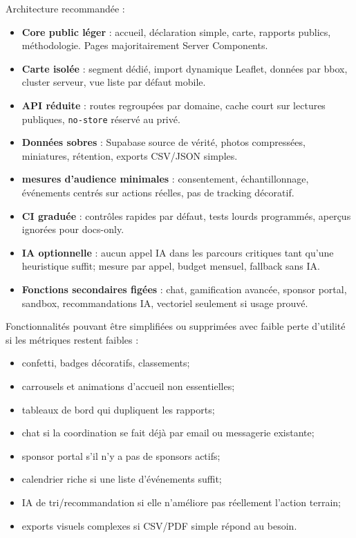 \documentclass[
  10pt,
  a4paper,
  DIV=11,
  numbers=noendperiod,
  oneside]{scrreprt}
\let\oldtextbf\textbf
\renewcommand{\textbf}[1]{\oldtextbf{\textcolor{cmmnavy}{#1}}}
\begin{document}
Architecture recommandée :

\begin{itemize}
\item
  \textbf{Core public léger} : accueil, déclaration simple, carte,
  rapports publics, méthodologie. Pages majoritairement Server
  Components.
\item
  \textbf{Carte isolée} : segment dédié, import dynamique Leaflet,
  données par bbox, cluster serveur, vue liste par défaut mobile.
\item
  \textbf{API réduite} : routes regroupées par domaine, cache court sur
  lectures publiques, \texttt{no-store} réservé au privé.
\item
  \textbf{Données sobres} : Supabase source de vérité, photos
  compressées, miniatures, rétention, exports CSV/JSON simples.
\item
  \textbf{mesures d'audience minimales} : consentement, échantillonnage,
  événements centrés sur actions réelles, pas de tracking décoratif.
\item
  \textbf{CI graduée} : contrôles rapides par défaut, tests lourds
  programmés, aperçus ignorées pour docs-only.
\item
  \textbf{IA optionnelle} : aucun appel IA dans les parcours critiques
  tant qu'une heuristique suffit; mesure par appel, budget mensuel,
  fallback sans IA.
\item
  \textbf{Fonctions secondaires figées} : chat, gamification avancée,
  sponsor portal, sandbox, recommandations IA, vectoriel seulement si
  usage prouvé.
\end{itemize}

Fonctionnalités pouvant être simplifiées ou supprimées avec faible perte
d'utilité si les métriques restent faibles :

\begin{itemize}
\item
  confetti, badges décoratifs, classements;
\item
  carrousels et animations d'accueil non essentielles;
\item
  tableaux de bord qui dupliquent les rapports;
\item
  chat si la coordination se fait déjà par email ou messagerie
  existante;
\item
  sponsor portal s'il n'y a pas de sponsors actifs;
\item
  calendrier riche si une liste d'événements suffit;
\item
  IA de tri/recommandation si elle n'améliore pas réellement l'action
  terrain;
\item
  exports visuels complexes si CSV/PDF simple répond au besoin.
\end{itemize}
\end{document}

